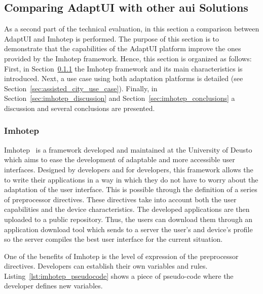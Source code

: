 \subsection{Comparing AdaptUI with other \ac{aui} Solutions}
\label{sec:imhotep_comparison}

As a second part of the technical evaluation, in this section a comparison 
between AdaptUI and Imhotep is performed. The purpose of this section is to 
demonstrate that the capabilities of the AdaptUI platform improve the ones 
provided by the Imhotep framework. Hence, this section is organized as follows: 
First, in Section~\ref{sec:imhotep_vs_adaptui} the Imhotep framework and its 
main characteristics is introduced. Next, a use case using both adaptation 
platforms is detailed (see Section~\ref{sec:assisted_city_use_case}). Finally, 
in Section~\ref{sec:imhotep_discussion} and Section~\ref{sec:imhotep_conclusions} 
a discussion and several conclusions are presented.

\subsubsection{Imhotep}
\label{sec:imhotep_vs_adaptui}

Imhotep~\citep{almeida_imhotep_2011} is a framework developed and maintained at
the University of Deusto which aims to ease the development of adaptable and 
more accessible user interfaces. Designed by developers and for developers, this
framework allows the to write their applications in a way in which they do not
have to worry about the adaptation of the user interface. This is possible 
through the definition of a series of preprocessor directives. These 
directives take into account both the user capabilities and the device 
characteristics. The developed applications are then uploaded to a public 
repository. Thus, the users can download them through an application download 
tool which sends to a server the user's and device's profile so the server 
compiles the best user interface for the current situation.

One of the benefits of Imhotep is the level of expression of the preprocessor
directives. Developers can establish their own variables and rules.
Listing~\ref{lst:imhotep_pseudocode} shows a piece of pseudo-code where the
developer defines new variables.

\inputminted[linenos=true, fontsize=\footnotesize, frame=lines]{java}{5_experiments_and_results/imhotep_pseudocode.txt}


